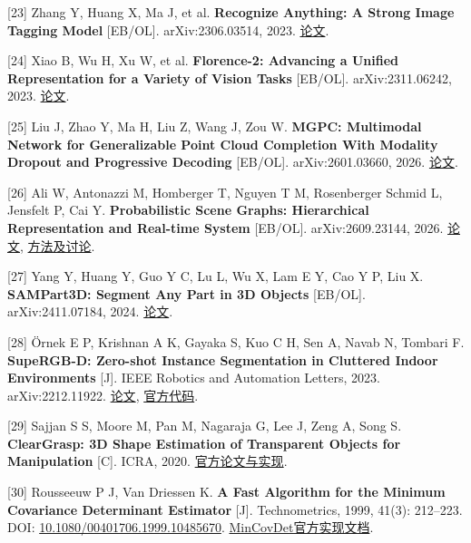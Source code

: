 \documentclass[UTF8,fontset=fandol]{ctexart}
\begin{document}
[23] Zhang Y, Huang X, Ma J, et al. \textbf{Recognize Anything: A Strong Image Tagging Model} [EB/OL]. arXiv:2306.03514, 2023. \href{https://arxiv.org/abs/2306.03514}{论文}.



[24] Xiao B, Wu H, Xu W, et al. \textbf{Florence-2: Advancing a Unified Representation for a Variety of Vision Tasks} [EB/OL]. arXiv:2311.06242, 2023. \href{https://arxiv.org/abs/2311.06242}{论文}.



[25] Liu J, Zhao Y, Ma H, Liu Z, Wang J, Zou W. \textbf{MGPC: Multimodal Network for Generalizable Point Cloud Completion With Modality Dropout and Progressive Decoding} [EB/OL]. arXiv:2601.03660, 2026. \href{https://arxiv.org/abs/2601.03660}{论文}.



[26] Ali W, Antonazzi M, Homberger T, Nguyen T M, Rosenberger Schmid L, Jensfelt P, Cai Y. \textbf{Probabilistic Scene Graphs: Hierarchical Representation and Real-time System} [EB/OL]. arXiv:2609.23144, 2026. \href{https://arxiv.org/abs/2609.23144}{论文}, \href{https://arxiv.org/html/2609.23144v1}{方法及讨论}.



[27] Yang Y, Huang Y, Guo Y C, Lu L, Wu X, Lam E Y, Cao Y P, Liu X. \textbf{SAMPart3D: Segment Any Part in 3D Objects} [EB/OL]. arXiv:2411.07184, 2024. \href{https://arxiv.org/abs/2411.07184}{论文}.



[28] Örnek E P, Krishnan A K, Gayaka S, Kuo C H, Sen A, Navab N, Tombari F. \textbf{SupeRGB-D: Zero-shot Instance Segmentation in Cluttered Indoor Environments} [J]. IEEE Robotics and Automation Letters, 2023. arXiv:2212.11922. \href{https://arxiv.org/abs/2212.11922}{论文}, \href{https://github.com/evinpinar/supergb-d}{官方代码}.



[29] Sajjan S S, Moore M, Pan M, Nagaraja G, Lee J, Zeng A, Song S. \textbf{ClearGrasp: 3D Shape Estimation of Transparent Objects for Manipulation} [C]. ICRA, 2020. \href{https://github.com/Shreeyak/cleargrasp}{官方论文与实现}.



[30] Rousseeuw P J, Van Driessen K. \textbf{A Fast Algorithm for the Minimum Covariance Determinant Estimator} [J]. Technometrics, 1999, 41(3): 212–223. DOI: \href{https://www.tandfonline.com/doi/abs/10.1080/00401706.1999.10485670}{10.1080/00401706.1999.10485670}. \href{https://scikit-learn.org/1.7/modules/generated/sklearn.covariance.MinCovDet.html}{MinCovDet官方实现文档}.
\end{document}
